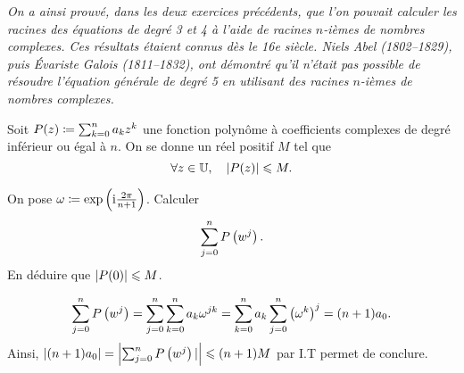 \documentclass{magnolia}
\begin{document}
\textit{On a ainsi prouvé, dans les deux exercices précédents, que l'on pouvait calculer les racines des équations de degré 3 et 4 à l'aide de racines $n$-ièmes de nombres complexes. Ces résultats étaient connus dès le 16e siècle. {\sc Niels Abel} (1802--1829), puis {\sc Évariste Galois} (1811--1832), ont démontré qu'il n'était pas possible de résoudre l'équation générale de degré 5 en utilisant des racines $n$-ièmes de nombres complexes.}

Soit $P(z)\coloneqq\sum_{k=0}^n a_k z^k$ une fonction polynôme à coefficients complexes de degré inférieur ou égal à $n$. On se donne un réel positif $M$ tel que
$$\forall z\in\U \qsep \abs{P(z)}\leq M.$$
\begin{questions}
\question On pose $\omega\coloneqq\exp\left({\rm i}\frac{2\pi}{n+1}\right)$. Calculer
  $$\sum_{j=0}^n P\left(w^j\right).$$
\question En déduire que $\left|P(0)\right|\leqslant M$.
\end{questions}

\begin{sol}
\begin{questions}
\question 
  $$\sum_{j=0}^n P\left(w^j\right)=\sum_{j=0}^n\sum_{k=0}^na_k\omega^{jk}=\sum_{k=0}^na_k\sum_{j=0}^n\left(\omega^{k}\right)^j=(n+1)a_0.$$
\question Ainsi, $|(n+1)a_0|=\left|\sum_{j=0}^n P\left(w^j\right)|\right|\leqslant (n+1)M$ par I.T permet de conclure.
\end{questions}
\end{sol}


\end{document}
